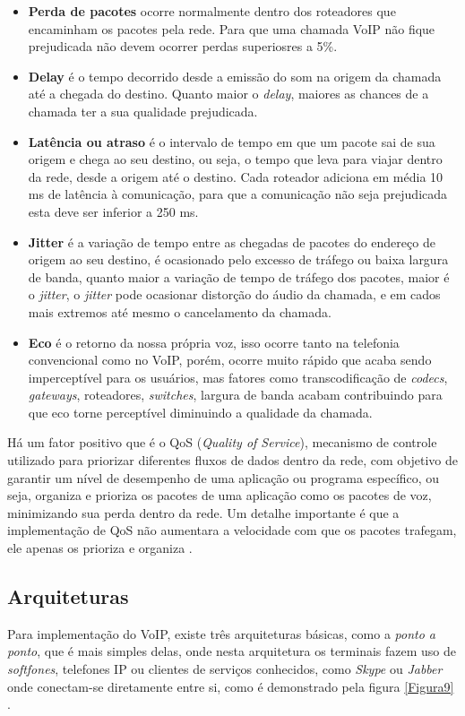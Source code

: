 \begin{itemize}
  \item \textbf{Perda de pacotes} ocorre normalmente dentro dos roteadores que encaminham os pacotes pela rede. Para que uma chamada VoIP não fique prejudicada não devem ocorrer perdas superiosres a 5\%.
  \item \textbf{Delay} é o tempo decorrido desde a emissão do som na origem da chamada até a chegada do destino. Quanto maior o \textit{delay}, maiores as chances de a chamada ter a sua qualidade prejudicada.
  \item \textbf{Latência ou atraso} é o intervalo de tempo em que um pacote sai de sua origem e chega ao seu destino, ou seja, o tempo que leva para viajar dentro da rede, desde a origem até o destino. Cada roteador adiciona em média 10 ms de latência à comunicação, para que a comunicação não seja prejudicada esta deve ser inferior a 250 ms.
  \item \textbf{Jitter} é a variação de tempo entre as chegadas de pacotes do endereço de origem ao seu destino, é ocasionado pelo excesso de tráfego ou baixa largura de banda, quanto maior a variação de tempo de tráfego dos pacotes, maior é o \textit{jitter}, o \textit{jitter} pode ocasionar distorção do áudio da chamada, e em cados mais extremos até mesmo o cancelamento da chamada.
  \item \textbf{Eco} é o retorno da nossa própria voz, isso ocorre tanto na telefonia convencional como no VoIP, porém, ocorre muito rápido que acaba sendo imperceptível para os usuários, mas fatores como transcodificação de \textit{codecs}, \textit{gateways}, roteadores, \textit{switches}, largura de banda acabam contribuindo para que eco torne perceptível diminuindo a qualidade da chamada.
\end{itemize}

Há um fator positivo que é o QoS (\textit{Quality of Service}), mecanismo de controle utilizado para priorizar diferentes fluxos de dados dentro da rede, com objetivo de garantir um nível de desempenho de uma aplicação ou programa específico, ou seja, organiza e prioriza os pacotes de uma aplicação como os pacotes de voz, minimizando sua perda dentro da rede. Um detalhe importante é que a implementação de QoS não aumentara a velocidade com que os pacotes trafegam, ele apenas os prioriza e organiza \cite{thiagowinkler2007}.

\subsection{Arquiteturas}
Para implementação do VoIP, existe três arquiteturas básicas, como a \textit{ponto a ponto}, que é mais simples delas, onde nesta arquitetura os terminais fazem uso de \textit{softfones}, telefones IP ou clientes de serviços conhecidos, como \textit{Skype} ou \textit{Jabber} onde conectam-se diretamente entre si, como é demonstrado pela figura \ref{Figura9} \cite{thiagowinkler2007}.

